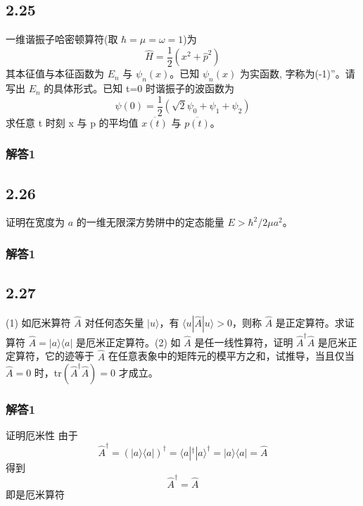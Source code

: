 \newpage
\subsection{2.25}
一维谐振子哈密顿算符(取 $\hbar = \mu = \omega = 1$)为
$$\hat{H} = \frac{1}{2}(x^2 + \hat{p}^2)$$
其本征值与本征函数为 $E_n$ 与 $\psi_n(x)$。已知 $\psi_n(x)$ 为实函数, 字称为(-1)”。请写出 $E_n$ 的具体形式。已知 t=0 时谐振子的波函数为
$$\psi(0) = \frac{1}{2} \left( \sqrt{2}\psi_0 + \psi_1 + \psi_2 \right)$$
求任意 t 时刻 x 与 p 的平均值 $\overline{x(t)}$ 与 $\overline{p(t)}$。

\subsubsection{解答1}

\newpage
\subsection{2.26}
证明在宽度为 $a$ 的一维无限深方势阱中的定态能量 $E > \hbar^2 / 2 \mu a^2$。

\subsubsection{解答1}


\newpage
\subsection{2.27}
(1) 如厄米算符 $\hat{A}$ 对任何态矢量 $|u\rangle$，有 $\langle u|\hat{A}|u\rangle > 0$，则称 $\hat{A}$ 是正定算符。求证算符 $\hat{A} = |a\rangle \langle a|$ 是厄米正定算符。(2) 如 $\hat{A}$ 是任一线性算符，证明 $\hat{A}^{\dagger} \hat{A}$ 是厄米正定算符，它的迹等于 $\hat{A}$ 在任意表象中的矩阵元的模平方之和，试推导，当且仅当 $\hat{A} = 0$ 时，tr$(\hat{A}^{\dagger} \hat{A}) = 0$ 才成立。

\subsubsection{解答1}
证明厄米性
由于
\begin{equation}
    \hat{A}^{\dagger}=\left( |a\rangle \langle a| \right) ^{\dagger}=\langle a|^{\dagger}|a\rangle ^{\dagger}=|a\rangle \langle a|=\hat{A}
\end{equation}
得到
\begin{equation}
    \hat{A}^{\dagger}=\hat{A}
\end{equation}
即是厄米算符

